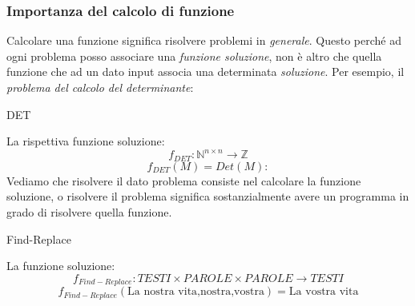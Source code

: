 \documentclass{article}
\begin{document}
\subsubsection{Importanza del calcolo di funzione}
Calcolare una funzione significa risolvere problemi in \textit{generale}. Questo
perché ad ogni problema posso associare una \textit{funzione soluzione}, non è altro che
quella funzione che ad un dato input associa una determinata \textit{soluzione}.
Per esempio, il \textit{problema del calcolo del determinante}:
\begin{algorithm}[hbt!]
    \caption{DET}\label{alg:det}
\end{algorithm}
La rispettiva funzione soluzione:
$$f_{DET}:\mathbb{N}^{n\times n}\rightarrow \mathbb{Z}$$
$$f_{DET}(M)=Det(M):$$
Vediamo che risolvere il dato problema consiste nel calcolare la funzione soluzione,
o risolvere il problema significa sostanzialmente avere un programma in grado
di risolvere quella funzione.
\begin{algorithm}[hbt!]
    \caption{Find-Replace}\label{alg:find-replace}
\end{algorithm}
La funzione soluzione:
$$f_{Find-Replace}:TESTI\times PAROLE\times PAROLE\rightarrow TESTI$$
$$f_{Find-Replace}(\text{La nostra vita,nostra,vostra})=\text{La vostra vita}$$
\end{document}
